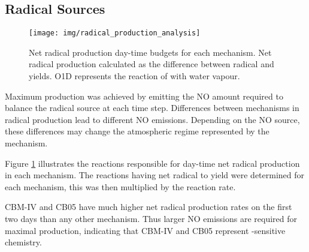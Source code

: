 %

\subsection{Radical Sources} \label{ss:radicals}

\begin{figure}
    \centering
    \texttt{[image: img/radical\_production\_analysis]}
    \vspace{0mm}
    \caption{Net radical production day-time budgets for each mechanism. Net radical production calculated as the difference between radical and  yields. O1D represents the reaction of  with water vapour.}
    \vspace{-4mm}
    \label{f:radical_production} 
\end{figure} 

Maximum  production was achieved by emitting the NO amount required to balance the radical source at each time step. 
Differences between mechanisms in radical production lead to different NO emissions.
Depending on the NO source, these differences may change the atmospheric regime represented by the mechanism.

Figure \ref{f:radical_production} illustrates the reactions responsible for day-time net radical production in each mechanism.
The reactions having net radical to  yield were determined for each mechanism, this was then multiplied by the reaction rate.

CBM-IV and CB05 have much higher net radical production rates on the first two days than any other mechanism.
Thus larger NO emissions are required for maximal  production, indicating that CBM-IV and CB05 represent -sensitive chemistry.

